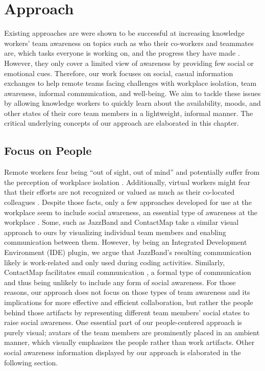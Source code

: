 \chapter{Approach}
\label{chapter:approach}
Existing approaches are were shown to be successful at increasing knowledge workers' team awareness on topics such as who their co-workers and teammates are, which tasks everyone is working on, and the progress they have made \autocite{biehl2007fastdash, jakobsen2009wipdash, cheng2003jazzing, deline2005easing}. However, they only cover a limited view of awareness by providing few social or emotional cues. Therefore, our work focuses on social, casual information exchanges to help remote teams facing challenges with workplace isolation, team awareness, informal communication, and well-being. We aim to tackle these issues by allowing knowledge workers to quickly learn about the availability, moods, and other states of their core team members in a lightweight, informal manner. The critical underlying concepts of our approach are elaborated in this chapter.

\section{Focus on People}
Remote workers fear being \enquote{out of sight, out of mind} \autocite{bailey1999advantages} and potentially suffer from the perception of workplace isolation \autocite{mulki2009set, marshall2007workplace}. Additionally, virtual workers might fear that their efforts are not recognized or valued as much as their co-located colleagues \autocite{cooper2002telecommuting}. Despite those facts, only a few approaches developed for use at the workplace seem to include social awareness, an essential type of awareness at the workplace \autocite{greenberg1996awareness}. Some, such as JazzBand and ContactMap \autocite{cheng2003jazzing, whittaker2004contactmap} take a similar visual approach to ours by visualizing individual team members and enabling communication between them. However, by being an Integrated Development Environment (IDE) plugin, we argue that JazzBand's resulting communication likely is work-related and only used during coding activities. Similarly, ContactMap facilitates email communication \autocite{whittaker2004contactmap}, a formal type of communication and thus being unlikely to include any form of social awareness. For those reasons, our approach does not focus on those types of team awareness and its implications for more effective and efficient collaboration, but rather the people behind those artifacts by representing different team members' social states to raise social awareness. One essential part of our people-centered approach is purely visual; avatars of the team members are prominently placed in an ambient manner, which visually emphasizes the people rather than work artifacts. Other social awareness information displayed by our approach is elaborated in the following section.

